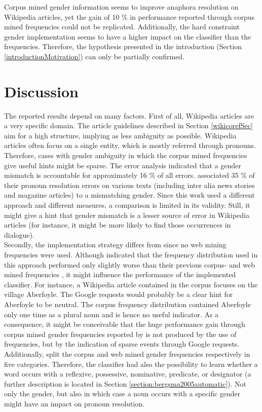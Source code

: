 Corpus mined gender information seems to improve anaphora resolution on Wikipedia articles, yet the gain of 10 \% in performance \cite{bergsma2005automatic} reported through corpus mined frequencies could not be replicated. Additionally, the hard constraint gender implementation seems to have a higher impact on the classifier than the frequencies. Therefore, the hypothesis presented in the introduction (Section \ref{introductionMotivation}) can only be partially confirmed. 

\section{Discussion}
\label{discussion}
The reported results depend on many factors. First of all, Wikipedia articles are a very specific domain. The article guidelines described in Section \ref{wikicorefSec} aim for a high structure, implying as less ambiguity as possible. Wikipedia articles often focus on a single entity, which is mostly referred through pronouns. Therefore, cases with gender ambiguity in which the corpus mined frequencies give useful hints might be sparse. The error analysis indicated that a gender mismatch is accountable for approximately 16 \% of all errors. \cite{kennedy1996anaphora} associated 35 \% of their pronoun resolution errors on various texts (including inter alia news stories and magazine articles) to a mismatching gender. Since this work used a different approach and different measures, a comparison is limited in its validity. Still, it might give a hint that gender mismatch is a lesser source of error in Wikipedia articles (for instance, it might be more likely to find those occurrences in dialogue).\\
Secondly, the implementation strategy differs from \cite{bergsma2005automatic} since no web mining frequencies were used. Although \cite{Bergsma:06} indicated that the frequency distribution used in this approach performed only slightly worse than their previous corpus- and web mined frequencies \citep{bergsma2005automatic}, it might influence the performance of the implemented classifier. For instance, a Wikipedia article contained in the corpus focuses on the village Aberfoyle. The Google requests would probably be a clear hint for Aberfoyle to be neutral. The corpus frequency distribution contained Aberfoyle only one time as a plural noun and is hence no useful indicator. As a consequence, it might be conceivable that the huge performance gain through corpus mined gender frequencies reported by \cite{bergsma2005automatic} is not produced by the use of frequencies, but by the indication of sparse events through Google requests.\\
Additionally, \cite{bergsma2005automatic} split the corpus and web mined gender frequencies respectively in five categories. Therefore, the classifier had also the possibility to learn whether a word occurs with a reflexive, possessive, nominative, predicate, or designator (a further description is located in Section \ref{section:bergsma2005automatic}). Not only the gender, but also in which case a noun occurs with a specific gender might have an impact on pronoun resolution.

